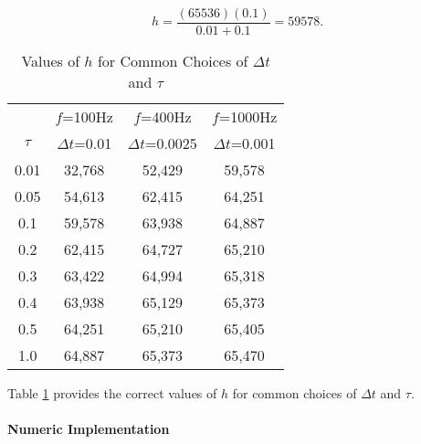 \begin{equation}
\label{eq:clfi0:slfa0:dsn0:04}
h = \frac{(65536) (0.1)}{0.01 + 0.1} =  59578 .
\end{equation}

\begin{table}
\caption{Values of $h$ for Common Choices of $\Delta t$ and $\tau$}
\label{tbl:clfi0:slfa0:dsn0:01}
\begin{center}
\begin{tabular}{|c|c|c|c|}
\hline
               & \small{$f$=100Hz}       & \small{$f$=400Hz}         & \small{$f$=1000Hz}             \\
\small{$\tau$} & \small{$\Delta t$=0.01} & \small{$\Delta t$=0.0025} & \small{$\Delta t$=0.001}       \\
\hline
\hline
\small{0.01}   & \small{32,768}          & \small{52,429}            & \small{59,578}                 \\
\hline
\small{0.05}   & \small{54,613}          & \small{62,415}            & \small{64,251}                 \\
\hline
\small{0.1}    & \small{59,578}          & \small{63,938}            & \small{64,887}                 \\
\hline
\small{0.2}    & \small{62,415}          & \small{64,727}            & \small{65,210}                 \\
\hline
\small{0.3}    & \small{63,422}          & \small{64,994}            & \small{65,318}                 \\
\hline
\small{0.4}    & \small{63,938}          & \small{65,129}            & \small{65,373}                 \\
\hline
\small{0.5}    & \small{64,251}          & \small{65,210}            & \small{65,405}                 \\
\hline
\small{1.0}    & \small{64,887}          & \small{65,373}            & \small{65,470}                 \\
\hline
\end{tabular}
\end{center}
\end{table}

Table \ref{tbl:clfi0:slfa0:dsn0:01} provides the correct values of $h$ for common
choices of $\Delta t$ and $\tau$.


\paragraph{Numeric Implementation}

